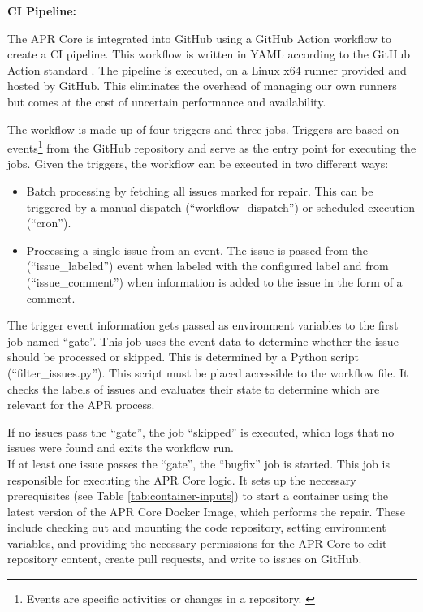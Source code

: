 \textbf{\ac{CI} Pipeline:}

The APR Core is integrated into GitHub using a GitHub Action workflow to create a \ac{CI} pipeline. This workflow is written in YAML according to the GitHub Action standard \cite{WorkflowSyntaxGitHub}. The pipeline is executed, on a Linux x64 runner provided and hosted by GitHub. This eliminates the overhead of managing our own runners but comes at the cost of uncertain performance and availability.

The workflow is made up of four triggers and three jobs. Triggers are based on events\footnote{Events are specific activities or changes in a repository. \cite{GitHubEventTypes}} from the GitHub repository and serve as the entry point for executing the jobs. Given the triggers, the workflow can be executed in two different ways:

\begin{itemize}
    \item Batch processing by fetching all issues marked for repair. This can be triggered by a manual dispatch (``workflow\_dispatch'') or scheduled execution (``cron'').
    \item Processing a single issue from an event. The issue is passed from the (``issue\_labeled'') event when labeled with the configured label and from (``issue\_comment'') when information is added to the issue in the form of a comment.
\end{itemize}

The trigger event information gets passed as environment variables to the first job named ``gate''. This job uses the event data to determine whether the issue should be processed or skipped. This is determined by a Python script (``filter\_issues.py''). This script must be placed accessible to the workflow file. It checks the labels of issues and evaluates their state to determine which are relevant for the APR process.

If no issues pass the ``gate'', the job ``skipped'' is executed, which logs that no issues were found and exits the workflow run.\\
If at least one issue passes the ``gate'', the ``bugfix'' job is started. This job is responsible for executing the APR Core logic. It sets up the necessary prerequisites (see Table \ref{tab:container-inputs}) to start a container using the latest version of the APR Core Docker Image, which performs the repair. These include checking out and mounting the code repository, setting environment variables, and providing the necessary permissions for the APR Core to edit repository content, create pull requests, and write to issues on GitHub.


